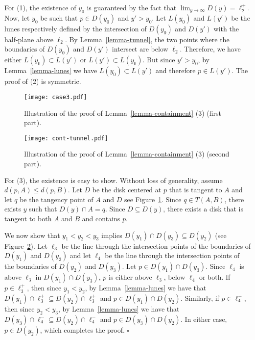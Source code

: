 \documentclass[pdftex,leqno,fleqn,12pt]{article}
\newenvironment{proof}{{\textit Proof:} \rm}{\hfill $\square$ \medskip\\}
\begin{document}
\begin{proof}
For (1), the existence of $y_0$ is guaranteed by the fact that $\lim_{y\rightarrow\infty}
D(y)=\ell_2^+$. Now, let $y_0$ be such that $p\in D(y_0)$ and $y'>y_0$. Let $L(y_0)$ and $L(y')$ be
the lunes respectively defined by the intersection of $D(y_0)$ and $D(y')$ with the half-plane
above $\ell_2$. By Lemma~\ref{lemma-tunnel}, the two points where the boundaries of $D(y_0)$ and
$D(y')$ intersect are below $\ell_2$. Therefore, we have either $L(y_0)\subset L(y')$ or
$L(y')\subset L(y_0)$. But since $y'>y_0$, by Lemma~\ref{lemma-lunes} we have $L(y_0)\subset L(y')$
and therefore $p\in L(y')$. The proof of (2) is symmetric.

\begin{figure}
\centering\texttt{[image: case3.pdf]}\caption{Illustration of the proof of
Lemma~\ref{lemma-containment} (3) (first part).} \label{fig-lemma-cont-tunnelb}
\end{figure}

\begin{figure}
\centering\texttt{[image: cont-tunnel.pdf]}\caption{Illustration of the proof of
Lemma~\ref{lemma-containment} (3) (second part).} \label{fig-lemma-cont-tunnel}
\end{figure}

For (3), the existence is easy to show. Without loss of generality, assume
$d(p,A) \leq d(p,B)$.  Let $D$ be the disk centered at $p$ that is tangent to
$A$ and let $q$ be the tangency point of $A$ and $D$ see
Figure~\ref{fig-lemma-cont-tunnelb}. Since $q\in T(A,B)$, there exists $y$ such
that $D(y)\cap A=q$. Since $D\subseteq D(y)$, there exists a disk that is tangent
to both $A$ and $B$ and contains $p$.

We now show that $y_1<y_2<y_3$ implies $D(y_1)\cap D(y_3)\subseteq D(y_2)$ (see
Figure~\ref{fig-lemma-cont-tunnel}). Let $\ell_3$ be the line through the intersection points of
the boundaries of $D(y_1)$ and $D(y_2)$ and let $\ell_4$ be the line through the intersection
points of the boundaries of $D(y_2)$ and $D(y_3)$. Let $p\in D(y_1)\cap D(y_3)$. Since $\ell_4$ is
above $\ell_3$ in $D(y_1)\cap D(y_3)$, $p$ is either above $\ell_3$, below $\ell_4$ or both. If
$p\in\ell_3^+$, then since $y_1<y_2$, by Lemma~\ref{lemma-lunes} we have that
$D(y_1)\cap\ell_3^+\subseteq D(y_2)\cap\ell_3^+$ and $p\in D(y_1)\cap D(y_2)$. Similarly, if
$p\in\ell_4^-$, then since $y_2<y_3$, by Lemma~\ref{lemma-lunes} we have that
$D(y_3)\cap\ell_4^-\subseteq D(y_2)\cap\ell_4^-$ and $p\in D(y_3)\cap D(y_2)$. In either case,
$p\in D(y_2)$, which completes the proof.
\end{proof}
\end{document}
